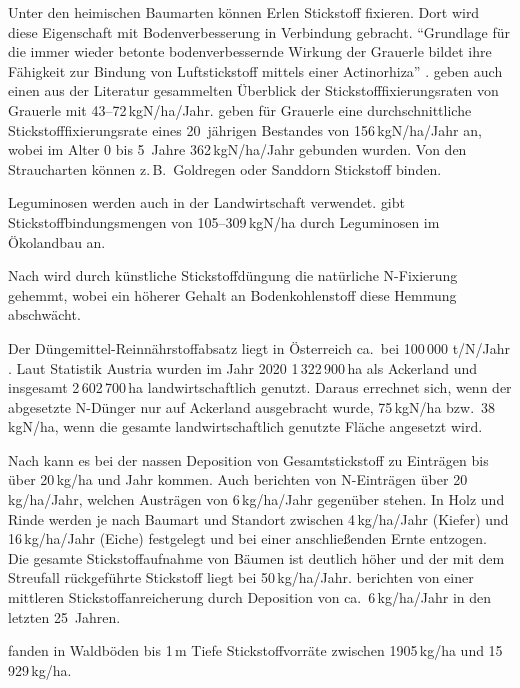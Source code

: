 \documentclass[twocolumn]{scrartcl}
\begin{document}
Unter den heimischen Baumarten können Erlen Stickstoff fixieren. Dort wird diese Eigenschaft mit Bodenverbesserung in Verbindung gebracht. \hypertarget{german:schuett2014alnusIncarna}{\enquote{Grundlage für die immer wieder betonte bodenverbessernde Wirkung der Grauerle bildet ihre Fähigkeit zur Bindung von Luftstickstoff mittels einer Actinorhiza}} \citep{schuett2014alnusIncarna}.
\citet{schuett2014alnusIncarna} geben auch einen aus der Literatur gesammelten Überblick der Stickstofffixierungsraten von Grauerle mit 43--72\,kgN/ha/Jahr.
\citet{cleve1971grauerle} geben für Grauerle eine durchschnittliche Stickstofffixierungsrate eines 20~jährigen Bestandes von 156\,kgN/ha/Jahr an, wobei im Alter 0 bis 5~Jahre 362\,kgN/ha/Jahr gebunden wurden.
Von den Straucharten können z.\,B.\ Goldregen oder Sanddorn Stickstoff binden.

Leguminosen werden auch in der Landwirtschaft verwendet. \citet{kolbe2008stickstoff} gibt Stickstoffbindungsmengen von 105--309\,kgN/ha durch Leguminosen im Ökolandbau an.

Nach \citet{zheng2023nFixierung} wird durch künstliche Stickstoffdüngung die natürliche N-Fixierung gehemmt, wobei ein höherer Gehalt an Bodenkohlenstoff diese Hemmung abschwächt.

Der Düngemittel-Reinnährstoffabsatz liegt in Österreich ca.\ bei 100\,000 t/N/Jahr \citep{ama2024duengemittel}. Laut Statistik Austria wurden im Jahr 2020 1\,322\,900\,ha als Ackerland und insgesamt 2\,602\,700\,ha landwirtschaftlich genutzt. Daraus errechnet sich, wenn der abgesetzte N-Dünger nur auf Ackerland ausgebracht wurde, 75\,kgN/ha bzw.\ 38\,kgN/ha, wenn die gesamte landwirtschaftlich genutzte Fläche angesetzt wird.

Nach \citet{uba1998deposition} kann es bei der nassen Deposition von Gesamtstickstoff zu Einträgen bis über 20\,kg/ha und Jahr kommen.
Auch \citet{raspe2018stickstoff} berichten von N-Einträgen über 20\,kg/ha/Jahr, welchen Austrägen von 6\,kg/ha/Jahr gegenüber stehen. In Holz und Rinde werden je nach Baumart und Standort zwischen 4\,kg/ha/Jahr (Kiefer) und 16\,kg/ha/Jahr (Eiche) festgelegt und bei einer anschließenden Ernte entzogen. Die gesamte Stickstoffaufnahme von Bäumen ist deutlich höher und der mit dem Streufall rückgeführte Stickstoff liegt bei 50\,kg/ha/Jahr.
\citet{raspe2018stickstoff} berichten von einer mittleren Stickstoffanreicherung durch Deposition von ca.\ 6\,kg/ha/Jahr in den letzten 25~Jahren.

\citet{emberger1965stickstoff} fanden in Waldböden bis 1\,m Tiefe Stickstoffvorräte zwischen 1905\,kg/ha und 15\,929\,kg/ha.
\end{document}
